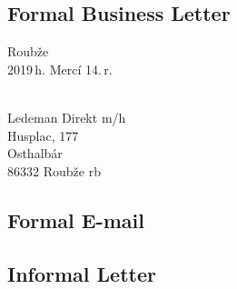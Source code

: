 \subsection{Formal Business Letter}
{\small
\begin{flushright}
	Roubže\\
	2019\,h. Mercí 14.\,r.
\end{flushright}

\\
Ledeman Direkt {\sc m/h}\\
Husplac, \textnumero{} 177\\
Osthalbár\\
86332 Roubže {\sc rb}
}

\subsection{Formal E-mail}




\subsection{Informal Letter}
